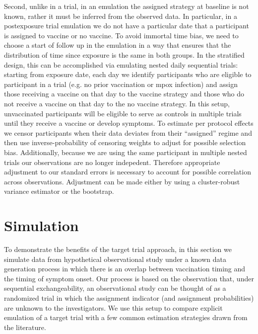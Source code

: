 \documentclass[11pt]{article}
\begin{document}
Second, unlike in a trial, in an emulation the assigned strategy at baseline is not known, rather it must be inferred from the observed data. In particular, in a postexposure trial emulation we do not have a particular date that a participant is assigned to vaccine or no vaccine. To avoid immortal time bias, we need to choose a start of follow up in the emulation in a way that ensures that the distribution of time since exposure is the same in both groups. In the stratified design, this can be accomplished via emulating nested daily sequential trials: starting from exposure date, each day we identify participants who are eligible to participant in a trial (e.g. no prior vaccination or mpox infection) and assign those receiving a vaccine on that day to the vaccine strategy and those who do not receive a vaccine on that day to the no vaccine strategy. In this setup, unvaccinated participants will be eligible to serve as controls in multiple trials until they receive a vaccine or develop symptoms. To estimate per protocol effects we censor participants when their data deviates from their ``assigned'' regime and then use inverse-probability of censoring weights to adjust for possible selection bias. Additionally, because we are using the same participant in multiple nested trials our observations are no longer indepedent. Therefore appropriate adjustment to our standard errors is necessary to account for possible correlation across observations. Adjustment can be made either by using a cluster-robust variance estimator or the bootstrap.  


\section{Simulation}
To demonstrate the benefits of the target trial approach, in this section we simulate data from hypothetical observational study under a known data generation process in which there is an overlap between vaccination timing and the timing of symptom onset. Our process is based on the observation that, under sequential exchangeability, an observational study can be thought of as a randomized trial in which the assignment indicator (and assignment probabilities) are unknown to the investigators. We use this setup to compare explicit emulation of a target trial with a few common estimation strategies drawn from the literature. 
\end{document}
